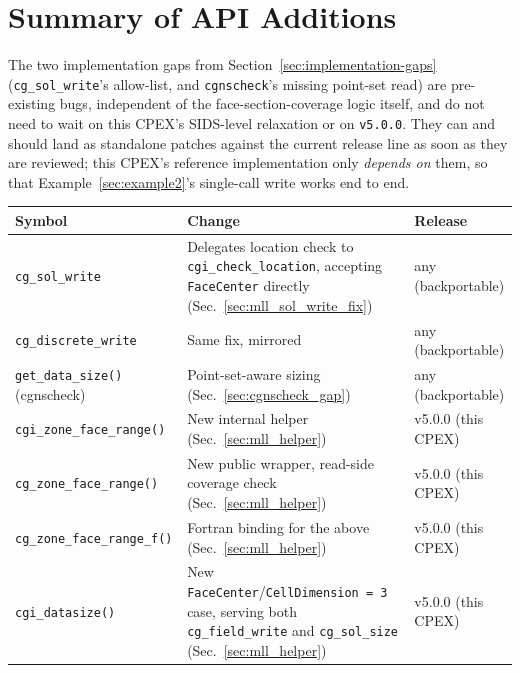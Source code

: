 \documentclass[11pt,letterpaper]{article}
\begin{document}
\section{Summary of API Additions}
\label{sec:api-summary}

The two implementation gaps from Section~\ref{sec:implementation-gaps}
(\texttt{cg\_sol\_write}'s allow-list, and \texttt{cgnscheck}'s missing
point-set read) are pre-existing bugs, independent of the face-section-coverage
logic itself, and do not need to wait on this CPEX's SIDS-level
relaxation or on \texttt{v5.0.0}. They can and should land as standalone
patches against the current release line as soon as they are reviewed;
this CPEX's reference implementation only \emph{depends on} them, so that
Example~\ref{sec:example2}'s single-call write works end to end.

\nolinenumbers
\begingroup
\renewcommand{\arraystretch}{1.5}
\begin{center}
\begin{tabular}{@{} l >{\raggedright\arraybackslash}p{} l @{}}
\toprule
\rowcolor{cgnsblue!15}
\textbf{Symbol} & \textbf{Change} & \textbf{Release} \\
\midrule
\texttt{cg\_sol\_write} & Delegates location check to \texttt{cgi\_check\_location}, accepting \texttt{FaceCenter} directly (Sec.~\ref{sec:mll_sol_write_fix}) & any (backportable) \\
\texttt{cg\_discrete\_write} & Same fix, mirrored & any (backportable) \\
\texttt{get\_data\_size()} (cgnscheck) & Point-set-aware sizing (Sec.~\ref{sec:cgnscheck_gap}) & any (backportable) \\
\midrule
\texttt{cgi\_zone\_face\_range()} & New internal helper (Sec.~\ref{sec:mll_helper}) & v5.0.0 (this CPEX) \\
\texttt{cg\_zone\_face\_range()} & New public wrapper, read-side coverage check (Sec.~\ref{sec:mll_helper}) & v5.0.0 (this CPEX) \\
\texttt{cg\_zone\_face\_range\_f()} & Fortran binding for the above (Sec.~\ref{sec:mll_helper}) & v5.0.0 (this CPEX) \\
\texttt{cgi\_datasize()} & New \texttt{FaceCenter}/\texttt{CellDimension~=~3} case, serving both \texttt{cg\_field\_write} and \texttt{cg\_sol\_size} (Sec.~\ref{sec:mll_helper}) & v5.0.0 (this CPEX) \\
\bottomrule
\end{tabular}
\end{center}
\endgroup
\linenumbers
\end{document}
